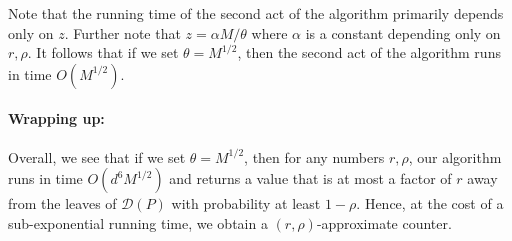 \documentclass[acmsmall]{acmart}
\begin{document}
Note that the running time of the second act of the algorithm primarily depends only on $z$. Further note that $z = \alpha M/\theta$ where $\alpha$ is a constant depending only on $r, \rho$.
It follows that if we set $\theta = M^{1/2}$, then the second act of the algorithm runs in time $O(M^{1/2})$.

\paragraph{Wrapping up: } Overall, we see that if we set $\theta = M^{1/2}$, then
for any numbers $r, \rho$, our algorithm runs in time $O(d^6 M^{1/2})$ and returns
a value that is at most a factor of $r$ away from the leaves of $\mathcal{D}(P)$ with probability at least $1 - \rho$. Hence, at the cost of a sub-exponential running time,
we obtain a $(r,\rho)$-approximate counter.




%
\end{document}
